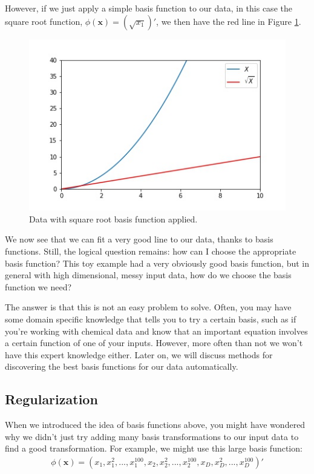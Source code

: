 However, if we just apply a simple basis function to our data, in this case the square root function, $\phi(\textbf{x}) = (\sqrt{x_{1}})'$, we then have the red line in Figure \ref{fig:lin-reg-w-basis-fn-fitted}.

\begin{figure}
    \centering
    \includegraphics[width=0.5\paperwidth]{../LinearRegression/fig/lin_reg_w_basis_fn_GEN.jpg}
    \caption{Data with square root basis function applied.}
    \label{fig:lin-reg-w-basis-fn-fitted}
\end{figure}

We now see that we can fit a very good line to our data, thanks to basis functions. Still, the logical question remains: how can I choose the appropriate basis function? This toy example had a very obviously good basis function, but in general with high dimensional, messy input data, how do we choose the basis function we need?

The answer is that this is not an easy problem to solve. Often, you may have some domain specific knowledge that tells you to try a certain basis, such as if you're working with chemical data and know that an important equation involves a certain function of one of your inputs. However, more often than not we won't have this expert knowledge either. Later on, we will discuss methods for discovering the best basis functions for our data automatically.

\subsection{Regularization}
When we introduced the idea of basis functions above, you might have wondered why we didn't just try adding many basis transformations to our input data to find a good transformation. For example, we might use this large basis function:
\begin{align*}
    \phi(\textbf{x}) = (x_{1}, x_{1}^{2}, ..., x_{1}^{100}, x_{2}, x_{2}^{2}, ..., x_{2}^{100}, x_{D}, x_{D}^{2}, ..., x_{D}^{100})'
\end{align*}

